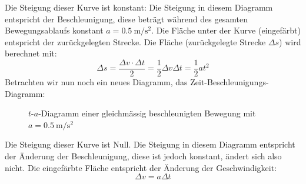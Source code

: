 Die Steigung dieser Kurve ist konstant: Die Steigung in diesem Diagramm entspricht der Beschleunigung, diese beträgt während des gesamten Bewegungsablaufs konstant $a=\SI{0.5}{\metre \per \second \squared}$. Die Fläche unter der Kurve (eingefärbt) entspricht der zurückgelegten Strecke. Die Fläche (zurückgelegte Strecke $\Delta s$) wird berechnet mit:
\[ \Delta s = \frac{\Delta v \cdot \Delta t}{2} = \frac{1}{2} \Delta v \Delta t = \frac{1}{2} a  t^{2} \]
\newpage
Betrachten wir nun noch ein neues Diagramm, das Zeit-Beschleunigungs-Diagramm:

\begin{figure}
\caption{$t$-$a$-Diagramm einer gleichmässig beschleunigten Bewegung mit $a=\SI{0.5}{\metre \per \second \squared}$}
\end{figure}

Die Steigung dieser Kurve ist Null. Die Steigung in diesem Diagramm entspricht der Änderung der Beschleunigung, diese ist jedoch konstant, ändert sich also nicht. Die eingefärbte Fläche entspricht der Änderung der Geschwindigkeit:
\[ \Delta v = a \Delta t \]

